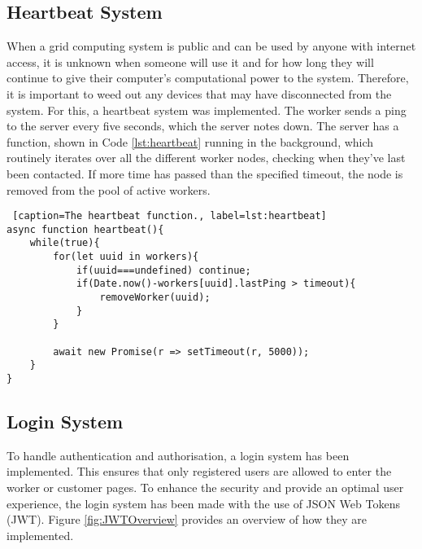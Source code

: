 \subsection{Heartbeat System} \label{sub:backendHeartbeat}
When a grid computing system is public and can be used by anyone with internet access, it is unknown when someone will use it and for how long they will continue to give their computer's computational power to the system. Therefore, it is important to weed out any devices that may have disconnected from the system. For this, a heartbeat system was implemented. The worker sends a ping to the server every five seconds, which the server notes down. The server has a function, shown in Code \ref{lst:heartbeat} running in the background, which routinely iterates over all the different worker nodes, checking when they've last been contacted. If more time has passed than the specified timeout, the node is removed from the pool of active workers.

\begin{lstlisting} [caption=The heartbeat function., label=lst:heartbeat]
async function heartbeat(){
    while(true){
        for(let uuid in workers){
            if(uuid===undefined) continue;
            if(Date.now()-workers[uuid].lastPing > timeout){
                removeWorker(uuid);
            }
        }
        
        await new Promise(r => setTimeout(r, 5000));
    }
}
\end{lstlisting}


\subsection{Login System} \label{sec:backendLogin} 
To handle authentication and authorisation, a login system has been implemented. This ensures that only registered users are allowed to enter the worker or customer pages. 
To enhance the security and provide an optimal user experience, the login system has been made with the use of JSON Web Tokens (JWT). Figure \ref{fig:JWTOverview} provides an overview of how they are implemented.


